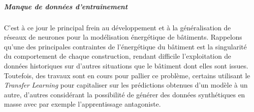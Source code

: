                 \subparagraph{Manque de données d'entraînement}
                C'est à ce jour le principal frein au développement et à la généralisation de
                réseaux de neurones pour la modélisation énergétique de bâtiments.
                Rappelons qu'une des principales contraintes de l'énergétique du bâtiment est la
                singularité du comportement de chaque construction, rendant difficile
                l'exploitation de données historiques sur d'autres situations que le bâtiment
                dont elles sont issues.
                Toutefois, des travaux sont en cours pour pallier ce problème, certains
                utilisant le \textit{Transfer Learning} pour capitaliser sur les prédictions
                obtenues d'un modèle à un autre, d'autres considérant la possibilité de générer
                des données synthétiques en masse avec par exemple l'apprentissage antagoniste\cite{frwiki:gan}.